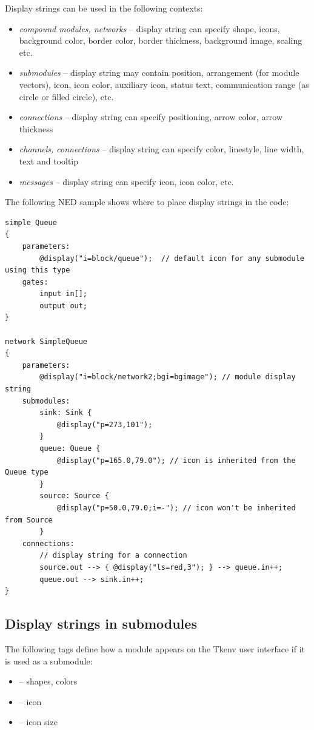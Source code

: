 Display strings can be used in the following contexts:
\begin{itemize}
  \item \textit{compound modules, networks} -- display string can specify 
        shape, icons, background color, border color, border thickness, 
        background image, scaling etc.
  \item \textit{submodules} -- display string may contain position, arrangement
        (for module vectors), icon, icon color, auxiliary icon, status text,
        communication range (as circle or filled circle), etc.
  \item \textit{connections} -- display string can specify positioning, arrow color,
        arrow thickness
  \item \textit{channels, connections} -- display string can specify color,
        linestyle, line width, text and tooltip
  \item \textit{messages} -- display string can specify icon, icon color, etc.
\end{itemize}


The following NED sample shows where to place display strings in the code:

\begin{verbatim}
simple Queue
{
    parameters:
        @display("i=block/queue");  // default icon for any submodule using this type
    gates:
        input in[];
        output out;
}

network SimpleQueue
{
    parameters:
        @display("i=block/network2;bgi=bgimage"); // module display string
    submodules:
        sink: Sink {
            @display("p=273,101"); 
        }
        queue: Queue {
            @display("p=165.0,79.0"); // icon is inherited from the Queue type
        }
        source: Source {
            @display("p=50.0,79.0;i=-"); // icon won't be inherited from Source
        }
    connections:
        // display string for a connection
        source.out --> { @display("ls=red,3"); } --> queue.in++;
        queue.out --> sink.in++;
}
\end{verbatim}


\subsection{Display strings in submodules}

The following tags define how a module appears on the Tkenv user interface
if it is used as a submodule:
\begin{itemize}
  \item{ -- shapes, colors}
  \item{ -- icon}
  \item{ -- icon size}
\end{itemize}

